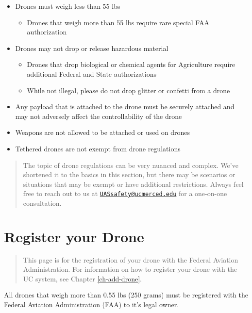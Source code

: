 \documentclass[
]{book}
\providecommand{\tightlist}{%
  \setlength{\itemsep}{0pt}\setlength{\parskip}{0pt}}
\begin{document}
\begin{itemize}
\tightlist
\item
  Drones must weigh less than 55 lbs

  \begin{itemize}
  \tightlist
  \item
    Drones that weigh more than 55 lbs require rare special FAA authorization
  \end{itemize}
\item
  Drones may not drop or release hazardous material

  \begin{itemize}
  \tightlist
  \item
    Drones that drop biological or chemical agents for Agriculture require additional Federal and State authorizations
  \item
    While not illegal, please do not drop glitter or confetti from a drone
  \end{itemize}
\item
  Any payload that is attached to the drone must be securely attached and may not adversely affect the controllability of the drone
\item
  Weapons are not allowed to be attached or used on drones
\item
  Tethered drones are not exempt from drone regulations
\end{itemize}

\begin{quote}
The topic of drone regulations can be very nuanced and complex. We've shortened it to the basics in this section, but there may be scenarios or situations that may be exempt or have additional restrictions. Always feel free to reach out to us at \href{mailto:UASsafety@ucmerced.edu}{\nolinkurl{UASsafety@ucmerced.edu}} for a one-on-one consultation.
\end{quote}

\hypertarget{ch-register}{%
\chapter{Register your Drone}\label{ch-register}}

\begin{quote}
This page is for the registration of your drone with the Federal Aviation Administration. For information on how to register your drone with the UC system, see Chapter \ref{ch-add-drone}.
\end{quote}

All drones that weigh more than 0.55 lbs (250 grams) must be registered with the Federal Aviation Administration (FAA) to it's legal owner.
\end{document}
